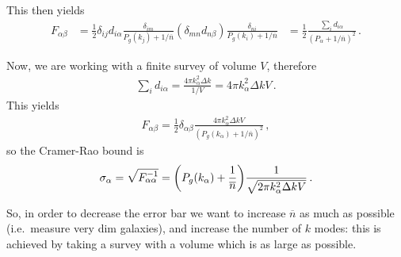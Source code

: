 \documentclass[main.tex]{subfiles}
\begin{document}
This then yields 
%
\begin{align}
F_{\alpha \beta } &= \frac{1}{2} \delta_{ij} d_{i \alpha } \frac{ \delta_{im}}{P_g (k_j) + 1/ \overline{n}} ( \delta_{mn} d_{n \beta }) \frac{ \delta_{ni}}{P_g (k_i) + 1/\overline{n}} 
&=
\frac{1}{2} \frac{\sum _{i} d_{i \alpha }}{(P_\alpha + 1/\overline{n})^2}
\,.
\end{align}
%

Now, we are working with a finite survey of volume \(V\), therefore 
%
\begin{align}
\sum _{i} d_{i \alpha } = \frac{4 \pi k_\alpha^2 \Delta k}{1/V} = 4 \pi k_\alpha^2 \Delta k V
\,.
\end{align}
%
This yields 
%
\begin{align}
F_{\alpha \beta } = \frac{1}{2} \delta_{\alpha \beta } \frac{4 \pi k_\alpha^2 \Delta k V}{(P_g (k_\alpha ) + 1/ \overline{n})^2}
\,,
\end{align}
%
so the Cramer-Rao bound is 
%
\begin{align}
\sigma _\alpha = \sqrt{F_{\alpha \alpha }^{-1}} = \qty(P_g (k_\alpha ) + \frac{1}{\overline{n}}) \frac{1}{\sqrt{2 \pi k_\alpha^2 \Delta k V}}
\,.
\end{align}

So, in order to decrease the error bar we want to increase \(\overline{n}\) as much as possible (i.e.\ measure very dim galaxies), and increase the number of \(k\) modes: this is achieved by taking a survey with a volume which is as large as possible.
\end{document}
